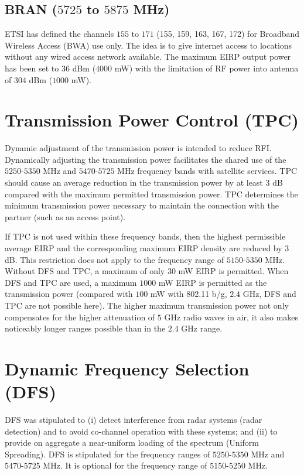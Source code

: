 \begin{itemize}
\subsection{BRAN ($5725$ to $5875$ MHz)}

ETSI has defined the channels $155$ to $171$ (155, 159, 163, 167, 172) for Broadband Wireless Access (BWA) use only. The idea is to give internet access to locations without any wired access network available. The maximum EIRP output power has been set to $36$ dBm ($4000$ mW) with the limitation of RF power into antenna of $304$ dBm ($1000$ mW).


\section{Transmission Power Control (TPC)}

Dynamic adjustment of the transmission power is intended to reduce RFI. Dynamically adjusting the transmission power facilitates the shared use of the $5250$-$5350$ MHz and $5470$-$5725$ MHz frequency bands with satellite services. TPC should cause an average reduction in the transmission power by at least $3$ dB compared with the maximum permitted transmission power. TPC determines the minimum transmission power necessary to maintain the connection with the partner (such as an access point).

If TPC is not used within these frequency bands, then the highest permissible average EIRP and the corresponding maximum EIRP density are reduced by $3$ dB. This restriction does not apply to the frequency range of $5150$-$5350$ MHz. Without DFS and TPC, a maximum of only $30$ mW EIRP is permitted. When DFS and TPC are used, a maximum $1000$ mW EIRP is permitted as the transmission power (compared with $100$ mW with 802.11 b/g, $2.4$ GHz, DFS and TPC are not possible here). The higher maximum transmission power not only compensates for the higher attenuation of $5$ GHz radio waves in air, it also makes noticeably longer ranges possible than in the $2.4$ GHz range. 


\section{Dynamic Frequency Selection (DFS)}

DFS was stipulated to (i) detect interference from radar systems (radar detection) and to avoid co-channel operation with these systems; and (ii) to provide on aggregate a near-uniform loading of the spectrum (Uniform Spreading). DFS is stipulated for the frequency ranges of $5250$-$5350$ MHz and $5470$-$5725$ MHz. It is optional for the frequency range of $5150$-$5250$ MHz.


\end{itemize}

